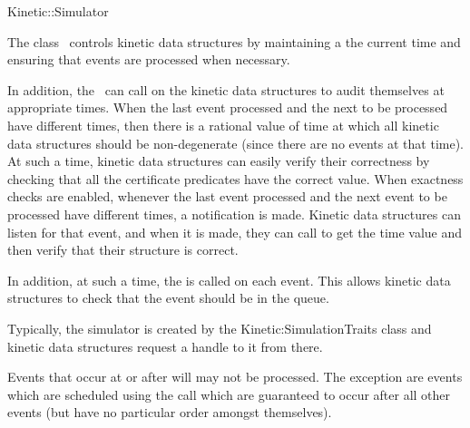 

\begin{ccRefConcept}{Kinetic::Simulator}  


\ccDefinition
  
The class \ccRefName\ controls kinetic data structures by maintaining
a the current time and ensuring that events are processed when
necessary.

In addition, the \ccRefName\ can call on the kinetic data structures
to audit themselves at appropriate times. When the last event
processed and the next to be processed have different times, then
there is a rational value of time at which all kinetic data structures
should be non-degenerate (since there are no events at that time). At
such a time, kinetic data structures can easily verify their
correctness by checking that all the certificate predicates have the
correct value. When exactness checks are enabled, whenever the last
event processed and the next event to be processed have different
times, a
 notification is made. Kinetic
data structures can listen for that event, and when it is made, they
can call  to get the time value and
then verify that their structure is correct.

In addition, at such a time, the  is called on
each event. This allows kinetic data structures to check that the
event should be in the queue.

Typically, the simulator is created by the Kinetic:SimulationTraits
class and kinetic data structures request a handle to it from there.

Events that occur at or after 
will may not be processed. The exception are events which are
scheduled using the  call which are
guaranteed to occur after all other events (but have no particular
order amongst themselves).



\end{ccRefConcept}
